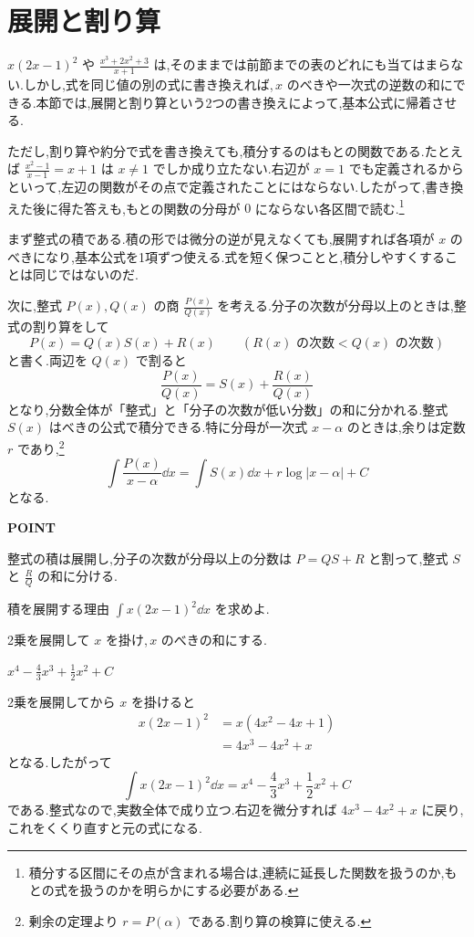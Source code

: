 \section{展開と割り算}\label{節:展開と割算}

$x(2x-1)^2$ や $\frac{x^3+2x^2+3}{x+1}$ は,そのままでは前節までの表のどれにも当てはまらない.しかし,式を同じ値の別の式に書き換えれば,\,$x$ のべきや一次式の逆数の和にできる.本節では,展開と割り算という2つの書き換えによって,基本公式に帰着させる.

ただし,割り算や約分で式を書き換えても,積分するのはもとの関数である.たとえば $\frac{x^2-1}{x-1}=x+1$ は $x\ne1$ でしか成り立たない.右辺が $x=1$ でも定義されるからといって,左辺の関数がその点で定義されたことにはならない.したがって,書き換えた後に得た答えも,もとの関数の分母が $0$ にならない各区間で読む.\footnote{積分する区間にその点が含まれる場合は,連続に延長した関数を扱うのか,もとの式を扱うのかを明らかにする必要がある.}

まず整式の積である.積の形では微分の逆が見えなくても,展開すれば各項が $x$ のべきになり,基本公式を1項ずつ使える.式を短く保つことと,積分しやすくすることは同じではないのだ.

次に,整式 $P(x),Q(x)$ の商 $\frac{P(x)}{Q(x)}$ を考える.分子の次数が分母以上のときは,整式の割り算をして
\[
 P(x)=Q(x)S(x)+R(x)\qquad(R(x)\text{ の次数}<Q(x)\text{ の次数})
\]
と書く.両辺を $Q(x)$ で割ると
\[
 \frac{P(x)}{Q(x)}=S(x)+\frac{R(x)}{Q(x)}
\]
となり,分数全体が「整式」と「分子の次数が低い分数」の和に分かれる.整式 $S(x)$ はべきの公式で積分できる.特に分母が一次式 $x-\alpha$ のときは,余りは定数 $r$ であり,\footnote{剰余の定理より $r=P(\alpha)$ である.割り算の検算に使える.}
\[
 \int\frac{P(x)}{x-\alpha}\dd x=\int S(x)\dd x+r\log|x-\alpha|+C
\]
となる.

\begin{bookpoint}
\textbf{POINT}\par
整式の積は展開し,分子の次数が分母以上の分数は $P=QS+R$ と割って,整式 $S$ と $\frac RQ$ の和に分ける.
\end{bookpoint}

\begin{example}{積を展開する理由}
$\int x(2x-1)^2\dd x$ を求めよ.
\end{example}

2乗を展開して $x$ を掛け,\,$x$ のべきの和にする.

$x^4-\frac43x^3+\frac12x^2+C$

2乗を展開してから $x$ を掛けると
\begin{align*}
 x(2x-1)^2
 &=x(4x^2-4x+1)\\
 &=4x^3-4x^2+x
\end{align*}
となる.したがって
\[
 \int x(2x-1)^2\dd x
 =x^4-\frac43x^3+\frac12x^2+C
\]
である.整式なので,実数全体で成り立つ.右辺を微分すれば $4x^3-4x^2+x$ に戻り,これをくくり直すと元の式になる.

